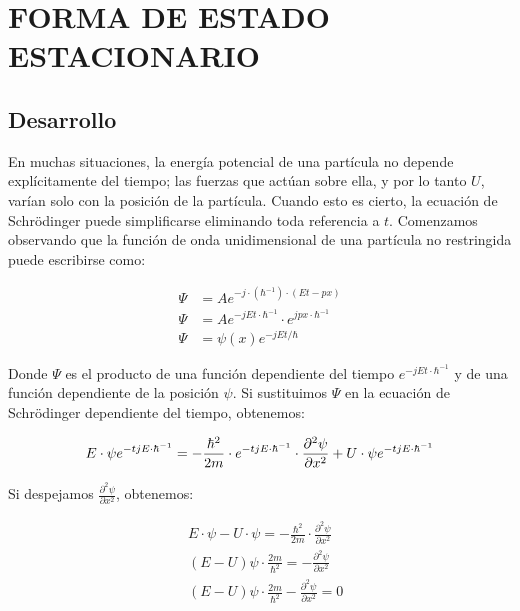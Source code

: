\documentclass[a4paper]{article}
\begin{document}
\section{FORMA DE ESTADO ESTACIONARIO}
        \subsection{Desarrollo}

        \indent En muchas situaciones, la energía potencial de una partícula no depende explícitamente del tiempo; las fuerzas que actúan sobre ella, y por lo tanto $U$, varían solo con la posición de la partícula. Cuando esto es cierto, la ecuación de Schrödinger puede simplificarse eliminando toda referencia a $t$.
        Comenzamos observando que la función de onda unidimensional de una partícula no restringida puede escribirse como:

            \begin{align*}
            \Psi &= Ae^{-j \cdot (\hbar^{-1}) \cdot (Et-px)} \\
            \Psi &= A e^{-jEt \cdot \hbar^{-1}} \cdot e^{jpx \cdot \hbar^{-1}} \\
            \Psi &= \psi(x) e^{-jEt/\hbar}
            \end{align*}

        \indent Donde $\Psi$ es el producto de una función dependiente del tiempo $e^{-jEt \cdot \hbar^{-1}}$ y de una función dependiente de la posición $\psi$. Si sustituimos $\Psi$ en la ecuación de Schrödinger dependiente del tiempo, obtenemos:

            \begin{equation}
            E \cdot \psi e^{-tjE \cdot \hbar^{-1}} = -\frac{\hbar^2}{2m} \cdot e^{-tjE \cdot \hbar^{-1}} \cdot \frac{\partial^2 \psi}{\partial x^2} + U \cdot \psi e^{-tjE \cdot \hbar^{-1}} \\
            \end{equation}

        \indent Si despejamos $\frac{\partial^2 \psi}{\partial x^2}$, obtenemos:

        \begin{align*}
            &E \cdot \psi - U \cdot \psi = -\frac{\hbar^2}{2m} \cdot \frac{\partial^2 \psi}{\partial x^2} \\
            &(E - U) \psi \cdot \frac{2m}{\hbar^2} = -\frac{\partial^2 \psi}{\partial x^2} \\
            &(E - U) \psi \cdot \frac{2m}{\hbar^2} - \frac{\partial^2 \psi}{\partial x^2} = 0
        \end{align*}
\end{document}
